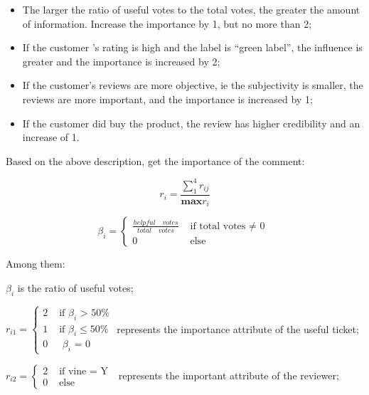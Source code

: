 \documentclass[UTF8]{article}
\begin{document}
\begin{itemize}

	\item The larger the ratio of useful votes to the total votes, the greater the amount of information. Increase the importance by 1, but no more than 2;

	\item If the customer ’s rating is high and the label is “green label”, the influence is greater and the importance is increased by 2;

	\item If the customer's reviews are more objective, ie the subjectivity is smaller, the reviews are more important, and the importance is increased by 1;

	\item If the customer did buy the product, the review has higher credibility and an increase of 1.

\end{itemize}

Based on the above description, get the importance of the comment:

\begin{equation}
r_{i}=\frac{\sum_{1}^{4}r_{ij}}{\mathbf{max} r_i}
\end{equation}

\begin{equation}
\beta_i=\left\{\begin{array}{ll}
\frac{helpful\quad votes}{total\quad votes} & \text { if total votes $\neq$ 0 } \\
0 & \text { else }
\end{array}\right.
\end{equation}

Among them:

$\beta_i$ is the ratio of useful votes;

$
r_{i1}=\left\{\begin{array}{ll}
2 & \text { if $\beta_i$ > 50\% } \\
1 & \text { if $\beta_i \leq $50\% } \\
0 & \text { $\beta_i$ = 0 }
\end{array}\right.
$
represents the importance attribute of the useful ticket;

$
r_{i2}=\left\{\begin{array}{ll}
2 & \text { if vine = Y } \\
0 & \text { else }
\end{array}\right.
$
represents the important attribute of the reviewer;
\end{document}
